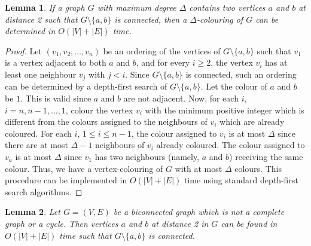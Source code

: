 \documentclass{article}
\newtheorem{lemma}{Lemma}
\begin{document}
\begin{lemma}
\label{lem:SequentialColouring}
If a graph $G$ with maximum degree $\Delta$ contains two vertices $a$ and $b$
at distance 2 such that $G\setminus\{a,b\}$ is connected, then a
$\Delta$-colouring of $G$ can be determined in $O(|V|+|E|)$ time.
\end{lemma}
\begin{proof}
Let $(v_1,v_2,\dots,v_n)$ be an ordering of the vertices of
$G\setminus\{a,b\}$ such that $v_1$ is a vertex adjacent to both $a$ and $b$,
and for every $i\geq2$, the vertex $v_i$ has at least one neighbour $v_j$ with
$j<i$. Since $G\setminus\{a,b\}$ is connected, such an ordering can be
determined by a depth-first search of $G\setminus\{a,b\}$. Let the colour of
$a$ and $b$ be $1$. This is valid since $a$ and $b$ are not adjacent. Now, for
each $i$, $i=n,n-1,\dots,1$, colour the vertex $v_i$ with the minimum positive
integer  which is different from the colours assigned to the neighbours of
$v_i$ which are already coloured. For each $i$, $1\leq i\leq n-1$, the colour
assigned to $v_i$ is at most $\Delta$ since there are at most $\Delta-1$
neighbours of $v_i$ already coloured. The  colour assigned to $v_a$ is at most
$\Delta$ since $v_1$ has two neighbours (namely, $a$ and $b$) receiving the
same colour. Thus, we have a vertex-colouring of $G$ with at most $\Delta$
colours. This procedure can be implemented in $O(|V|+|E|)$ time using standard
depth-first search algorithms. 
\end{proof}

\begin{lemma}
\label{lem:FindAB}
Let $G=(V,E)$ be a biconnected graph which is not a complete graph or a cycle.
Then vertices $a$ and $b$ at distance 2 in $G$ can be found in $O(|V|+|E|)$
time such that $G\setminus\{a,b\}$ is connected.
\end{lemma}
\end{document}
